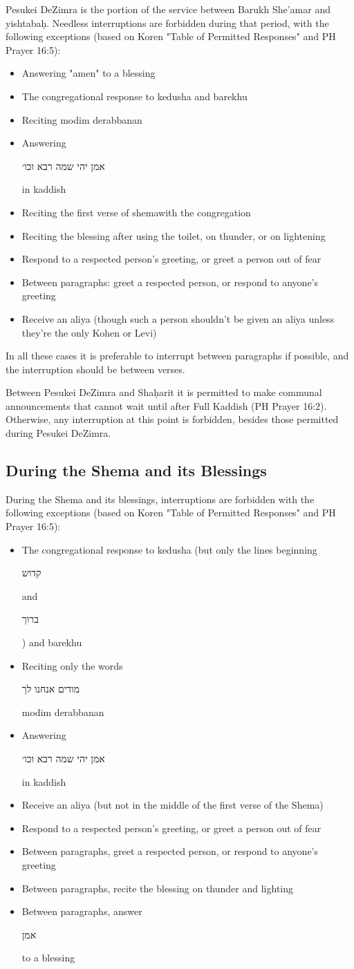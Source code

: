 \documentclass[11pt]{article}
\newcommand{\hebword}[1]{‎\begin{hebrew}\beginR #1 \endR\end{hebrew}}
\begin{document}
Pesukei DeZimra is the portion of the service between Barukh She'amar and yishtaba\d{h}. Needless interruptions are forbidden during that period, with the following exceptions (based on Koren "Table of Permitted Responses" and PH Prayer 16:5):
\begin{itemize}
	\item Answering "amen" to a blessing 
	\item The congregational response to kedusha and barekhu
	\item Reciting modim derabbanan
	\item Answering \hebword{אמן יהי שמה רבא וכו׳} in kaddish
	\item Reciting the first verse of shema\space with the congregation
	\item Reciting the blessing after using the toilet, on thunder, or on lightening
	\item Respond to a respected person's greeting, or greet a person out of fear
	\item Between paragraphs: greet a respected person, or respond to anyone's greeting
	\item Receive an aliya (though such a person shouldn't be given an aliya unless they're the only Kohen or Levi)
\end{itemize}

In all these cases it is preferable to interrupt between paragraphs if possible, and the interruption should be between verses.

Between Pesukei DeZimra and Sha\d{h}arit it is permitted to make communal announcements that cannot wait until after Full Kaddish (PH Prayer 16:2).  Otherwise, any interruption at this point is forbidden, besides those permitted during Pesukei DeZimra.

\subsection{During the Shema and its Blessings}

During the Shema and its blessings, interruptions are forbidden with the following exceptions (based on Koren "Table of Permitted Responses" and PH Prayer 16:5):
\begin{itemize}
	\item The congregational response to kedusha (but only the lines beginning \hebword{קדוש} and \hebword{ברוך}) and barekhu
	\item Reciting only the words \hebword{מודים אנחנו לך} modim derabbanan
	\item Answering \hebword{אמן יהי שמה רבא וכו׳} in kaddish
	\item Receive an aliya (but not in the middle of the first verse of the Shema)
	\item Respond to a respected person's greeting, or greet a person out of fear
	\item Between paragraphs, greet a respected person, or respond to anyone's greeting
	\item Between paragraphs, recite the blessing on thunder and lighting
	\item Between paragraphs, answer \hebword{אמן} to a blessing
\end{itemize}
\end{document}
